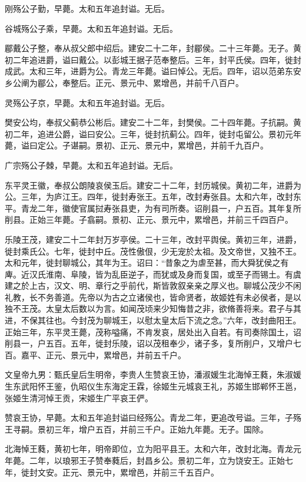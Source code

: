 \documentclass[12pt,UTF8]{ctexbook}
\begin{document}
刚殇公子勤，早薨。太和五年追封谥。无后。

谷城殇公子乘，早薨。太和五年追封谥。无后。

郿戴公子整，奉从叔父郎中绍后。建安二十二年，封郿侯。二十三年薨。无子。黄初二年追进爵，谥曰戴公。以彭城王据子范奉整后。三年，封平氏侯。四年，徙封成武。太和三年，进爵为公。青龙三年薨。谥曰悼公。无后。四年，诏以范弟东安乡公阐为郿公，奉整后。正元、景元中、累增邑，并前千八百户。

灵殇公子京，早薨。太和五年追封谥。无后。

樊安公均，奉叔父蓟恭公彬后。建安二十二年，封樊侯。二十四年薨。子抗嗣。黄初二年，追进公爵，谥曰安公。三年，徙封抗蓟公。四年，徙封屯留公。景初元年薨，谥曰定公。子谌嗣。景初、正元、景元中，累增邑，并前千九百户。

广宗殇公子棘，早薨。太和五年追封谥。无后。

东平灵王徽，奉叔公朗陵哀侯玉后。建安二十二年，封历城侯。黄初二年，进爵为公。三年，为庐江王。四年，徙封寿张王。五年，改封寿张县。太和六年，改封东平。青龙二年，徽使官属挝寿张县吏，为有司所奏。诏削县一，户五百。其年复所削县。正始三年薨。子翕嗣。景初、正元、景元中，累增邑，并前三千四百户。

乐陵王茂，建安二十二年封万岁亭侯。二十三年，改封平舆侯。黄初三年，进爵，徙封乘氏公。七年，徙封中丘。茂性傲佷，少无宠於太祖。及文帝世，又独不王。太和元年，徙封聊城公，其年为王。诏曰：“昔象之为虐至甚，而大舜犹侯之有庳。近汉氏淮南、阜陵，皆为乱臣逆子，而犹或及身而复国，或至子而锡土。有虞建之於上古，汉文、明、章行之乎前代，斯皆敦叙亲亲之厚义也。聊城公茂少不闲礼教，长不务善道。先帝以为古之立诸侯也，皆命贤者，故姬姓有未必侯者，是以独不王茂。太皇太后数以为言。如闻茂顷来少知悔昔之非，欲脩善将来。君子与其进，不保其往也。今封茂为聊城王，以慰太皇太后下流之念。”六年，改封曲阳王。正始三年，东平灵王薨，茂称嗌痛，不肯发哀，居处出入自若。有司奏除国土，诏削县一，户五百。五年，徙封乐陵，诏以茂租奉少，诸子多，复所削户，又增户七百。嘉平、正元、景元中，累增邑，并前五千户。

文皇帝九男：甄氏皇后生明帝，李贵人生赞哀王协，潘淑媛生北海悼王蕤，朱淑媛生东武阳怀王鉴，仇昭仪生东海定王霖，徐姬生元城哀王礼，苏姬生邯郸怀王邕，张姬生清河悼王贡，宋姬生广平哀王俨。

赞哀王协，早薨。太和五年追封谥曰经殇公。青龙二年，更追改号谥。三年，子殇王寻嗣。景初三年，增户五百，并前三千户。正始九年薨。无子。国除。

北海悼王蕤，黄初七年，明帝即位，立为阳平县王。太和六年，改封北海。青龙元年薨。二年，以琅邪王子赞奉蕤后，封昌乡公。景初二年，立为饶安王。正始七年，徙封文安。正元、景元中，累增邑，并前三千五百户。
\end{document}
